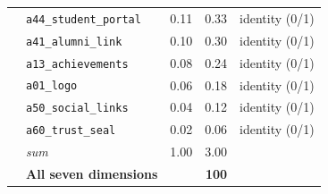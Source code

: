 \begin{longtable}{@{}llrrp{4.6cm}@{}}
& \texttt{a44\_student\_portal} & 0.11 & 0.33 & \small identity (0/1) \\
& \texttt{a41\_alumni\_link} & 0.10 & 0.30 & \small identity (0/1) \\
& \texttt{a13\_achievements} & 0.08 & 0.24 & \small identity (0/1) \\
& \texttt{a01\_logo} & 0.06 & 0.18 & \small identity (0/1) \\
& \texttt{a50\_social\_links} & 0.04 & 0.12 & \small identity (0/1) \\
& \texttt{a60\_trust\_seal} & 0.02 & 0.06 & \small identity (0/1) \\
& \emph{sum} & 1.00 & 3.00 & \\\addlinespace[3pt]
\midrule
& \textbf{All seven dimensions} & & \textbf{100} & \\
\end{longtable}
